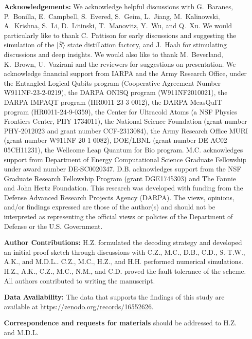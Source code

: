 \documentclass[prl,twocolumn,superscriptaddress,secnumarabic,balancelastpage,amsmath,amssymb]{revtex4-2}
\newcommand{\lket}[1]{|{\overline{#1}}\rangle}
\begin{document}
\noindent\textbf{Acknowledgements: }
We acknowledge helpful discussions with G.~Baranes, P.~Bonilla, E.~Campbell, S.~Evered, S.~Geim, L.~Jiang, M.~Kalinowski, A.~Krishna, S.~Li, D.~Litinski, T.~Manovitz, Y.~Wu, and Q.~Xu.
%
We would particularly like to thank C.~Pattison for early discussions and suggesting the simulation of the $\lket{S}$ state distillation factory, and J.~Haah for stimulating discussions and deep insights.
%
We would also like to thank M.~Beverland, K.~Brown, U.~Vazirani and the reviewers for suggestions on presentation.
%
We acknowledge financial support from IARPA and the Army Research Office, under the Entangled Logical Qubits program (Cooperative Agreement Number W911NF-23-2-0219), the DARPA ONISQ program (W911NF2010021), the DARPA IMPAQT program (HR0011-23-3-0012), the DARPA MeasQuIT program (HR0011-24-9-0359), the Center for Ultracold Atoms (a NSF Physics Frontiers Center, PHY-1734011), the National Science Foundation (grant number PHY-2012023 and grant number CCF-2313084), the Army Research Office MURI (grant number W911NF-20-1-0082), DOE/LBNL (grant number DE-AC02-05CH11231), the Wellcome Leap Quantum for Bio program.
%
M.C. acknowledges support from Department of Energy Computational Science Graduate Fellowship under award number DE-SC0020347. 
%
D.B. acknowledges support from the NSF Graduate Research Fellowship Program (grant DGE1745303) and The Fannie and John Hertz Foundation.
%
This research was developed with funding from the Defense Advanced Research Projects Agency (DARPA). 
%
The views, opinions, and/or findings expressed are those of the author(s) and should not be interpreted as representing the official views or policies of the Department of Defense or the U.S. Government.

\noindent\textbf{Author Contributions: }
H.Z. formulated the decoding strategy and developed an initial proof sketch through discussions with C.Z., M.C., D.B., C.D., S.-T.W., A.K., and M.D.L..
%
C.Z., M.C., H.Z., and H.H. performed numerical simulations.
%
H.Z., A.K., C.Z., M.C., N.M., and C.D. proved the fault tolerance of the scheme.
%
All authors contributed to writing the manuscript.

\noindent\textbf{Data Availability: }
The data that supports the findings of this study are available at \href{https://zenodo.org/records/16552626}{https://zenodo.org/records/16552626}.

\noindent\textbf{Correspondence and requests for materials} should be addressed to H.Z. and M.D.L.\\



%

\clearpage


%
\end{document}
